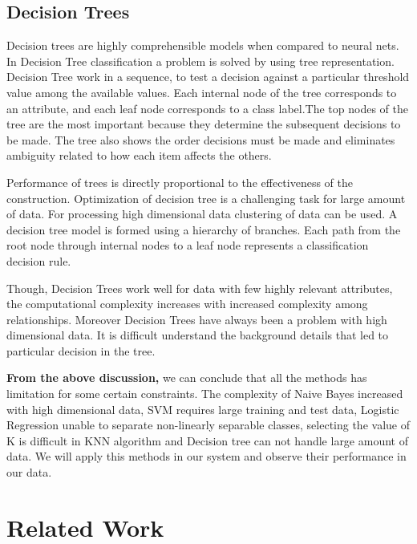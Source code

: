  \subsection{Decision Trees}
 Decision trees are highly comprehensible models when compared to neural nets.
 In Decision Tree classification a problem is solved by using tree representation. Decision Tree work in a sequence, to test a decision against a particular threshold value among the available values. Each internal node of the tree corresponds to an attribute, and each leaf node corresponds to a class label.The top nodes of the tree are the most important because they determine the subsequent decisions to be made. The tree also shows the order decisions must be made and eliminates ambiguity related to how each item affects the others.
\par
\vspace{0.5cm}
Performance of trees is directly proportional to the effectiveness of the construction. Optimization of decision tree is a challenging task for large amount of data. For processing high dimensional data clustering of data can be used.
A decision tree model is formed using a hierarchy of branches. Each path from the root node through internal nodes to a leaf node represents a classification decision rule.
\par
\vspace{0.5cm}
Though, Decision Trees work well for data with few highly relevant attributes, the computational complexity increases with increased complexity among relationships. Moreover Decision Trees have always been a problem with high dimensional data. It is difficult understand the background details that led to particular decision in the tree. 

\par
\vspace{0.7cm}
\noindent
\textbf{From the above discussion,} we can conclude that all the methods has limitation for some certain constraints. The complexity of Naive Bayes increased with high dimensional data, SVM requires large training and test data, Logistic Regression unable to separate non-linearly separable classes, selecting the value of K is difficult in KNN algorithm and Decision tree can not handle large amount of data. We will apply this methods in our system and observe their performance in our data.

\section{Related Work}

